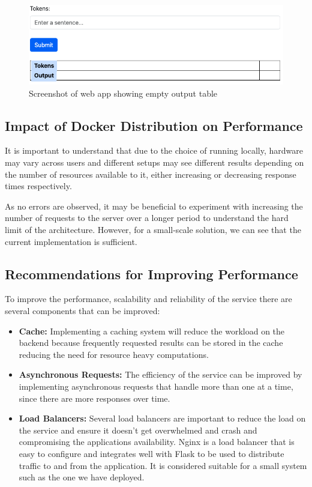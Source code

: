 \documentclass{surreydissertation}
\begin{document}
\begin{figure}
    \centering
    \includegraphics[width=0.6\linewidth]{Figures/emptyfrontend.png}
    \caption{Screenshot of web app showing empty output table}
    \label{fig:reset}
 \end{figure}

\subsection{Impact of Docker Distribution on Performance}
It is important to understand that due to the choice of running locally, hardware may vary across users and different setups may see different results depending on the number of resources available to it, either increasing or decreasing response times respectively. 

As no errors are observed, it may be beneficial to experiment with increasing the number of requests to the server over a longer period to understand the hard limit of the architecture. However, for a small-scale solution, we can see that the current implementation is sufficient.

\subsection{Recommendations for Improving Performance}
To improve the performance, scalability and reliability of the service there are several components that can be improved:

\begin{itemize}
    \item \textbf{Cache:} Implementing a caching system will reduce the workload on the backend because frequently requested results can be stored in the cache reducing the need for resource heavy computations. 
    \item \textbf{Asynchronous Requests:} The efficiency of the service can be improved by implementing asynchronous requests that handle more than one at a time, since there are more responses over time.
    \item \textbf{Load Balancers:} Several load balancers are important to reduce the load on the service and ensure it doesn't get overwhelmed and crash and compromising the applications availability. Nginx is a load balancer that is easy to configure and integrates well with Flask to be used to distribute traffic to and from the application. It is considered suitable for a small system such as the one we have deployed.
\end{itemize}
\end{document}
